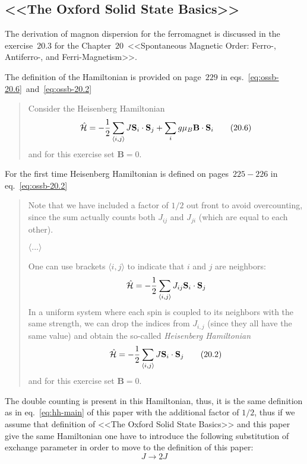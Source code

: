\subsection{<<The Oxford Solid State Basics>>\cite{simon2013oxford}}
    The derivation of magnon dispersion for the ferromagnet is discussed in the exercise~$20.3$ for the Chapter~$20$~<<Spontaneous Magnetic Order: Ferro-, Antiferro-, and Ferri-Magnetism>>.

    The definition of the Hamiltonian is provided on page~$229$ in eqs.~\eqref{eq:ossb-20.6}~and~\eqref{eq:ossb-20.2}

    \begin{quote}
        Consider the Heisenberg Hamiltonian
        \begin{equation}
            \hat{\mathcal{H}} = -\dfrac{1}{2}\sum_{\langle i,j \rangle} J \mathbf{S}_i \cdot \mathbf{S}_j + \sum_i g\mu_B \mathbf{B} \cdot \mathbf{S}_i \label{eq:ossb-20.6} \tag{20.6}
        \end{equation}
        and  for this exercise set $\mathbf{B} = 0$.
    \end{quote}

    For the first time Heisenberg Hamiltonian is defined on pages~$225-226$ in eq.~\eqref{eq:ossb-20.2}
    \begin{quote}
        Note that we have included a factor of $1/2$ out front to avoid overcounting, since the sum actually counts both $J_{ij}$ and $J_{ji}$ (which are equal to each other).

        $\langle ... \rangle$

        One can use brackets $\langle i,j\rangle$ to indicate that $i$ and $j$ are neighbors:
        \begin{equation}
            \hat{\mathcal{H}} = -\dfrac{1}{2}\sum_{\langle i,j \rangle} J_{ij} \mathbf{S}_i \cdot \mathbf{S}_j
        \end{equation}
        In a uniform system where each spin is coupled to its neighbors with the same strength, we can drop the indices from $J_{i,j}$ (since they all have the same value) and obtain the so-called \textit{Heisenberg Hamiltonian}
        \begin{equation}
            \hat{\mathcal{H}} = -\dfrac{1}{2}\sum_{\langle i,j \rangle} J \mathbf{S}_i \cdot \mathbf{S}_j \label{eq:ossb-20.2} \tag{20.2}
        \end{equation}
        and  for this exercise set $\mathbf{B} = 0$.
    \end{quote}

    The double counting is present in this Hamiltonian, thus, it is the same definition as in eq.~\eqref{eq:hh-main} of this paper 
    with the additional factor of $1/2$, thus if we assume that definition of <<The Oxford Solid State Basics>> and this paper give the same Hamiltonian one have to 
    introduce the following substitution of exchange parameter in order to move to the definition of this paper:
    \begin{equation}
        J \rightarrow 2J \label{eq:ossb-sub}
    \end{equation}

